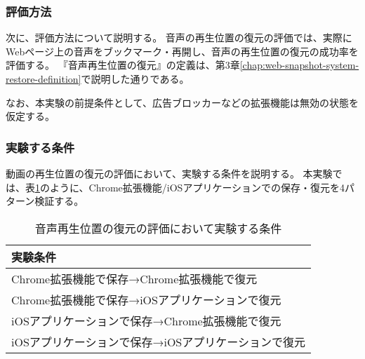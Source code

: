 \subsubsection{評価方法}
次に、評価方法について説明する。
音声の再生位置の復元の評価では、実際にWebページ上の音声をブックマーク・再開し、音声の再生位置の復元の成功率を評価する。
『音声再生位置の復元』の定義は、第3章\ref{chap:web-snapshot-system-restore-definition}で説明した通りである。

なお、本実験の前提条件として、広告ブロッカーなどの拡張機能は無効の状態を仮定する。

\subsubsection{実験する条件}
動画の再生位置の復元の評価において、実験する条件を説明する。
本実験では、表\ref{tb:evl-audio-audio-conditions}のように、Chrome拡張機能/iOSアプリケーションでの保存・復元を4パターン検証する。

\begin{table}[htbp]
  \label{tb:evl-audio-audio-conditions}
  \caption{音声再生位置の復元の評価において実験する条件}
  \begin{center}
    \begin{tabular}{|l|}
    \hline
    実験条件  \\\hline\hline
    Chrome拡張機能で保存→Chrome拡張機能で復元 \\ \hline
    Chrome拡張機能で保存→iOSアプリケーションで復元 \\ \hline
    iOSアプリケーションで保存→Chrome拡張機能で復元 \\ \hline
    iOSアプリケーションで保存→iOSアプリケーションで復元 \\ \hline
    \end{tabular}
  \end{center}
\end{table}

